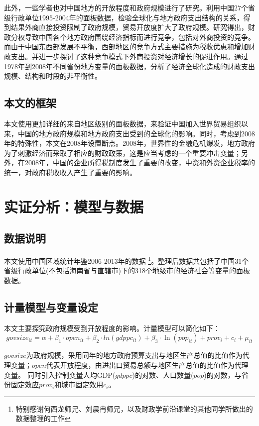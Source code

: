 \documentclass[10pt]{article}
\begin{document}
此外，一些学者也对中国地方的开放程度和政府规模进行了研究。\cite{cai2008}利用中国27个省级行政单位1995-2004年的面板数据，检验全球化与地方政府支出结构的关系，得到结果外商直接投资限制了政府规模，贸易开放度扩大了政府规模。\cite{wang2007}研究得出，财政分权导致中国各个地方政府围绕经济指标而进行竞争，包括对外商投资的竞争。而由于中国东西部发展不平衡，西部地区的竞争方式主要措施为税收优惠和增加财政支出。并进一步探讨了这种竞争模式下外商投资对经济增长的促进作用。\cite{sheng2010}通过1978年到2008年不同省份地方变量的面板数据，分析了经济全球化造成的财政支出规模、结构和时段的非平衡性。
\subsection{本文的框架}
本文使用更加详细的来自地区级别的面板数据，来验证中国加入世界贸易组织以来，中国的地方政府规模和地方政府支出受到的全球化的影响。同时，考虑到2008年的特殊性，本文在2008年设置断点。2008年，世界性的金融危机爆发，地方政府为了刺激经济而采取了相应的财政政策，这是应当考虑的一个重要冲击变量；另外，在2008年，中国的企业所得税制度发生了重要的改变，中资和外资企业税率的统一，对政府税收收入产生了重要的影响。

\section{实证分析：模型与数据}
\subsection{数据说明}
本文使用中国区域统计年鉴2006-2013年的数据
\footnote{特别感谢何西龙师兄、刘晨冉师兄，以及财政学前沿课堂的其他同学所做出的数据整理的工作}。整理后数据共包括了中国31个省级行政单位(不包括海南省与直辖市)下的318个地级市的经济社会等变量的面板数据。
\subsection{计量模型与变量设定}
本文主要探究政府规模受到开放程度的影响。计量模型可以简化如下：
\begin{equation}
 govsize_{it} = \alpha + \beta_1 \cdot open_{it} + \beta_2 \cdot ln(gdppc_{it}) + \beta_3 \cdot \ln(pop_{it}) + prov_{i} +c_i + \mu_{it}
 \end{equation}


$govsize$为政府规模，采用同年的地方政府预算支出与地区生产总值的比值作为代理变量；$open$代表开放程度，由进出口贸易总额与地区生产总值的比值作为代理变量。
同时引入控制变量人均GDP($gdppc$)的对数、人口数量($pop$)的对数，与省份固定效应$prov_i$和城市固定效用$c_i$。
\end{document}
